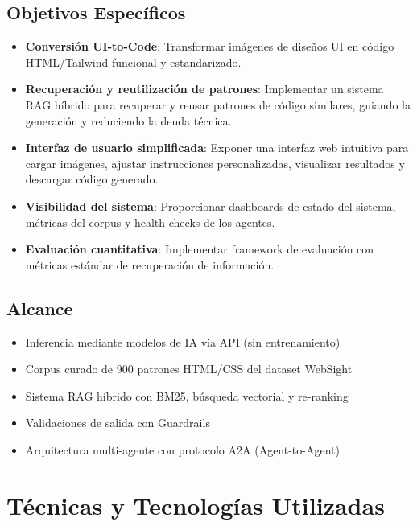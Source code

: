 \documentclass[12pt,a4paper]{article}
\begin{document}
\subsection{Objetivos Específicos}

\begin{itemize}[leftmargin=*]
    \item \textbf{Conversión UI-to-Code}: Transformar imágenes de diseños UI en código HTML/Tailwind funcional y estandarizado.
    
    \item \textbf{Recuperación y reutilización de patrones}: Implementar un sistema RAG híbrido para recuperar y reusar patrones de código similares, guiando la generación y reduciendo la deuda técnica.
    
    \item \textbf{Interfaz de usuario simplificada}: Exponer una interfaz web intuitiva para cargar imágenes, ajustar instrucciones personalizadas, visualizar resultados y descargar código generado.
    
    \item \textbf{Visibilidad del sistema}: Proporcionar dashboards de estado del sistema, métricas del corpus y health checks de los agentes.
    
    \item \textbf{Evaluación cuantitativa}: Implementar framework de evaluación con métricas estándar de recuperación de información.
\end{itemize}

\subsection{Alcance}

\begin{itemize}
    \item Inferencia mediante modelos de IA vía API (sin entrenamiento)
    \item Corpus curado de 900 patrones HTML/CSS del dataset WebSight
    \item Sistema RAG híbrido con BM25, búsqueda vectorial y re-ranking
    \item Validaciones de salida con Guardrails
    \item Arquitectura multi-agente con protocolo A2A (Agent-to-Agent)
\end{itemize}

\section{Técnicas y Tecnologías Utilizadas}
\end{document}
